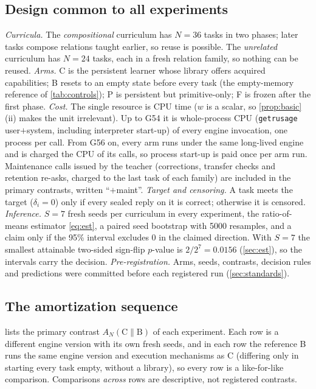 \documentclass[11pt]{article}
\theoremstyle{remark}
\begin{document}
\subsection{Design common to all experiments}\label{sec:pl-design}
\emph{Curricula.} The \emph{compositional} curriculum has $N=36$ tasks in two phases; later tasks compose relations taught earlier, so reuse is possible. The \emph{unrelated} curriculum has $N=24$ tasks, each in a fresh relation family, so nothing can be reused.
\emph{Arms.} C is the persistent learner whose library offers acquired capabilities; B resets to an empty state before every task (the empty-memory reference of \cref{tab:controls}); P is persistent but primitive-only; F is frozen after the first phase.
\emph{Cost.} The single resource is CPU time ($w$ is a scalar, so \cref{prop:basic}(ii) makes the unit irrelevant). Up to G54 it is whole-process CPU (\texttt{getrusage} user$+$system, including interpreter start-up) of every engine invocation, one process per call. From G56 on, every arm runs under the same long-lived engine and is charged the CPU of its calls, so process start-up is paid once per arm run. Maintenance calls issued by the teacher (corrections, transfer checks and retention re-asks, charged to the last task of each family) are included in the primary contrasts, written ``$+$maint''.
\emph{Target and censoring.} A task meets the target ($\delta_i=0$) only if every sealed reply on it is correct; otherwise it is censored.
\emph{Inference.} $S=7$ fresh seeds per curriculum in every experiment, the ratio-of-means estimator \eqref{eq:est}, a paired seed bootstrap with 5000 resamples, and a claim only if the 95\% interval excludes $0$ in the claimed direction. With $S=7$ the smallest attainable two-sided sign-flip $p$-value is $2/2^7=0.0156$ (\cref{sec:est}), so the intervals carry the decision.
\emph{Pre-registration.} Arms, seeds, contrasts, decision rules and predictions were committed before each registered run (\cref{sec:standards}).

\subsection{The amortization sequence}\label{sec:pl-seq}
 lists the primary contrast $A_N(\text{C}\|\text{B})$ of each experiment. Each row is a different engine version with its own fresh seeds, and in each row the reference B runs the same engine version and execution mechanisms as C (differing only in starting every task empty, without a library), so every row is a like-for-like comparison. Comparisons \emph{across} rows are descriptive, not registered contrasts.
\end{document}
